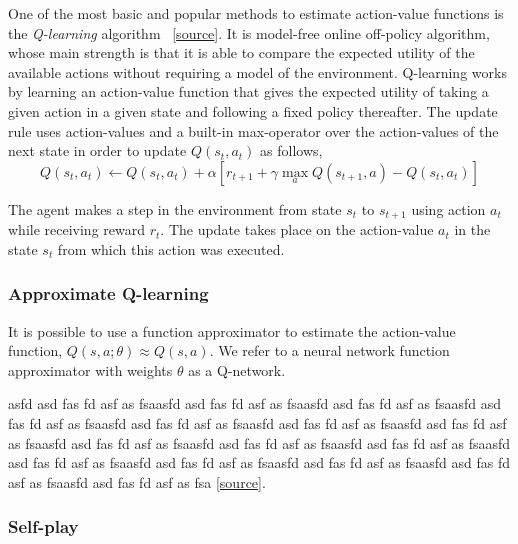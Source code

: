 \documentclass{article}
\newcommand{\GithubURL}[1]{[\href{https://github.com/davidrobles/mlnd-capstone-code/blob/master/#1}{source}]}
\begin{document}
One of the most basic and popular methods to estimate action-value functions is the
\emph{Q-learning} algorithm~\citep{Watkins1989PhD} \GithubURL{capstone/rl/learners/qlearning.py}.
It is model-free online off-policy algorithm, whose main strength is that it is able to compare the
expected utility of the available actions without requiring a model of the environment. Q-learning
works by learning an action-value function that gives the expected utility of taking a given action
in a given state and following a fixed policy thereafter. The update rule uses action-values and a
built-in max-operator over the action-values of the next state in order to update $Q(s_t, a_t)$ as
follows,
%
\begin{equation} Q(s_t, a_t) \gets Q(s_t, a_t) + \alpha [r_{t+1} + \gamma \max_a Q(s_{t+1}, a) -
Q(s_t, a_t)] \end{equation}

The agent makes a step in the environment from state $s_t$ to $s_{t+1}$ using action $a_t$ while
receiving reward $r_t$. The update takes place on the action-value $a_t$ in the state $s_t$ from
which this action was executed.

\subsubsection{Approximate Q-learning}

It is possible to use a function approximator to estimate the action-value function, $Q(s,a;\theta)
\approx Q(s,a)$. We refer to a neural network function approximator with weights $\theta$ as a
Q-network.

asfd asd fas fd asf as fsaasfd asd fas fd asf as fsaasfd asd fas fd asf as fsaasfd asd fas fd asf as
fsaasfd asd fas fd asf as fsaasfd asd fas fd asf as fsaasfd asd fas fd asf as fsaasfd asd fas fd asf
as fsaasfd asd fas fd asf as fsaasfd asd fas fd asf as fsaasfd asd fas fd asf as fsaasfd asd fas fd
asf as fsaasfd asd fas fd asf as fsaasfd asd fas fd asf as fsaasfd asd fas fd asf as fsa
\GithubURL{capstone/rl/learners/qlearning.py}.

\subsubsection{Self-play}

\end{document}
